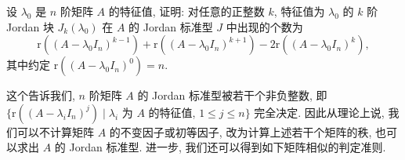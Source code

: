 \documentclass[../../main.tex]{subfiles}
\begin{document}
\begin{proposition}\label{proposition:Jordan块的个数与秩的关系}
设 $\lambda_0$ 是 $n$ 阶矩阵 $A$ 的特征值, 证明: 对任意的正整数 $k$, 特征值为 $\lambda_0$ 的 $k$ 阶 Jordan 块 $J_k(\lambda_0)$ 在 $A$ 的 Jordan 标准型 $J$ 中出现的个数为
\[
\mathrm{r}((A - \lambda_0 I_n)^{k - 1}) + \mathrm{r}((A - \lambda_0 I_n)^{k + 1}) - 2\mathrm{r}((A - \lambda_0 I_n)^k),
\]
其中约定 $\mathrm{r}((A - \lambda_0 I_n)^0) = n$.
\end{proposition}
\begin{remark}
这个告诉我们, $n$ 阶矩阵 $A$ 的 Jordan 标准型被若干个非负整数, 即 $\{\mathrm{r}((A - \lambda_i I_n)^j) \mid \lambda_i$ 为 $A$ 的特征值, $1 \leq j \leq n\}$ 完全决定. 因此从理论上说, 我们可以不计算矩阵 $A$ 的不变因子或初等因子, 改为计算上述若干个矩阵的秩, 也可以求出 $A$ 的 Jordan 标准型. 进一步, 我们还可以得到如下矩阵相似的判定准则.
\end{remark}
\end{document}
